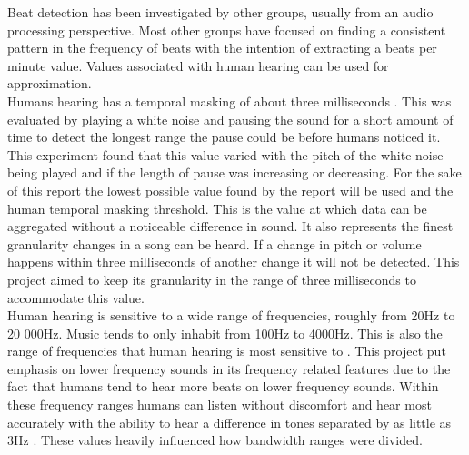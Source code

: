 Beat detection has been investigated by other groups, usually from an audio processing perspective. Most other groups have focused on finding a consistent pattern in the frequency of beats with the intention of extracting a beats per minute value. Values associated with human hearing can be used for approximation.\\

Humans hearing has a temporal masking of about three milliseconds \cite{temporalmasking}. This was evaluated by playing a white noise and pausing the sound for a short amount of time to detect the longest range the pause could be before humans noticed it. This experiment found that this value varied with the pitch of the white noise being played and if the length of pause was increasing or decreasing. For the sake of this report the lowest possible value found by the report will be used and the human temporal masking threshold. This is the value at which data can be aggregated without a noticeable difference in sound. It also represents the finest granularity changes in a song can be heard. If a change in pitch or volume happens within three milliseconds of another change it will not be detected. This project aimed to keep its granularity in the range of three milliseconds to accommodate this value.\\

Human hearing is sensitive to a wide range of frequencies, roughly from 20Hz to 20 000Hz\cite{frequencylimits}. Music tends to only inhabit from 100Hz to 4000Hz. This is also the range of frequencies that human hearing is most sensitive to \cite{frequencylimits}. This project put emphasis on lower frequency sounds in its frequency related features due to the fact that humans tend to hear more beats on lower frequency sounds. Within these frequency ranges humans can listen without discomfort and hear most accurately with the ability to hear a difference in tones separated by as little as 3Hz \cite{frequencylimits}. These values heavily influenced how bandwidth ranges were divided.

